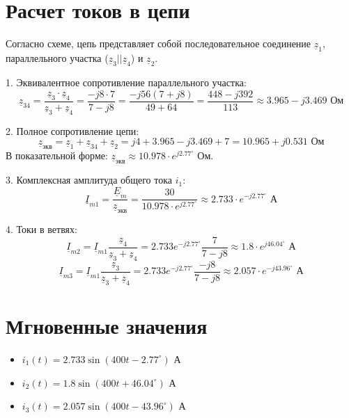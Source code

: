 \documentclass[a4paper,12pt]{article}
\newcommand{\complex}[1]{\underline{#1}}
\begin{document}
\section{Расчет токов в цепи}
Согласно схеме, цепь представляет собой последовательное соединение $\complex{z}_1$, параллельного участка ($\complex{z}_3 || \complex{z}_4$) и $\complex{z}_2$.

1. Эквивалентное сопротивление параллельного участка:
\begin{equation}
\complex{z}_{34} = \frac{\complex{z}_3 \cdot \complex{z}_4}{\complex{z}_3 + \complex{z}_4} = \frac{-j8 \cdot 7}{7 - j8} = \frac{-j56(7 + j8)}{49 + 64} = \frac{448 - j392}{113} \approx 3.965 - j3.469 \text{ Ом}
\end{equation}

2. Полное сопротивление цепи:
\begin{equation}
\complex{z}_{экв} = \complex{z}_1 + \complex{z}_{34} + \complex{z}_2 = j4 + 3.965 - j3.469 + 7 = 10.965 + j0.531 \text{ Ом}
\end{equation}
В показательной форме: $\complex{z}_{экв} \approx 10.978 \cdot e^{j2.77^\circ} \text{ Ом}$.

3. Комплексная амплитуда общего тока $i_1$:
\begin{equation}
\complex{I}_{m1} = \frac{\complex{E}_m}{\complex{z}_{экв}} = \frac{30}{10.978 \cdot e^{j2.77^\circ}} \approx 2.733 \cdot e^{-j2.77^\circ} \text{ А}
\end{equation}

4. Токи в ветвях:
\begin{equation}
\complex{I}_{m2} = \complex{I}_{m1} \frac{\complex{z}_4}{\complex{z}_3 + \complex{z}_4} = 2.733 e^{-j2.77^\circ} \frac{7}{7-j8} \approx 1.8 \cdot e^{j46.04^\circ} \text{ А}
\end{equation}
\begin{equation}
\complex{I}_{m3} = \complex{I}_{m1} \frac{\complex{z}_3}{\complex{z}_3 + \complex{z}_4} = 2.733 e^{-j2.77^\circ} \frac{-j8}{7-j8} \approx 2.057 \cdot e^{-j43.96^\circ} \text{ А}
\end{equation}

\section{Мгновенные значения}
\begin{itemize}
    \item $i_1(t) = 2.733 \sin(400t - 2.77^\circ) \text{ А}$
    \item $i_2(t) = 1.8 \sin(400t + 46.04^\circ) \text{ А}$
    \item $i_3(t) = 2.057 \sin(400t - 43.96^\circ) \text{ А}$
\end{itemize}
\end{document}
